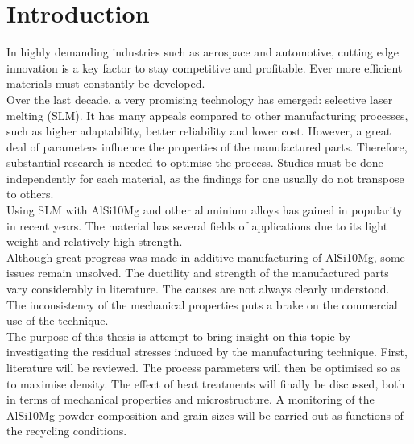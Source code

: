 \chapter{Introduction}
\label{Chap1}

In highly demanding industries such as aerospace and automotive, cutting edge innovation is a key factor to stay competitive and profitable. Ever more efficient materials must constantly be developed.\\

Over the last decade, a very promising technology has emerged: selective laser melting (SLM). It has many appeals compared to other manufacturing processes, such as higher adaptability, better reliability and lower cost. However, a great deal of parameters influence the properties of the manufactured parts. Therefore, substantial research is needed to optimise the process. Studies must be done independently for each material, as the findings for one usually do not transpose to others.\\

Using SLM with AlSi10Mg and other aluminium alloys has gained in popularity in recent years. The material has several fields of applications due to its light weight and relatively high strength.\\

Although great progress was made in additive manufacturing of AlSi10Mg, some issues remain unsolved. The ductility and strength of the manufactured parts vary considerably in literature. The causes are not always clearly understood. The inconsistency of the mechanical properties puts a brake on the commercial use of the technique.\\

The purpose of this thesis is attempt to bring insight on this topic by investigating the residual stresses induced by the manufacturing technique. First, literature will be reviewed. The process parameters will then be optimised so as to maximise density. The effect of heat treatments will finally be discussed, both in terms of mechanical properties and microstructure. A monitoring of the AlSi10Mg powder composition and grain sizes will be carried out as functions of the recycling conditions.\\